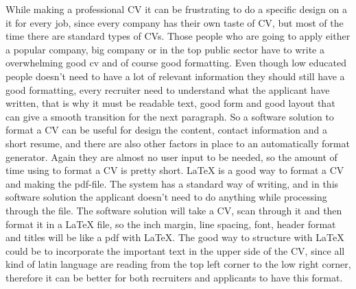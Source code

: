 While making a professional CV it can be frustrating to do a specific design on a it for every job, 
since every company has their own taste of CV, but most of the time there are standard types of CVs. 
Those people who are going to apply either a popular company, big company or
in the top public sector have to write a overwhelming good cv and of course good formatting.
Even though low educated people doesn't need to have a lot of relevant information they should still have a good formatting, 
every recruiter need to understand what the applicant have written, that is why it must be readable text, good form 
and good layout that can give a smooth transition for the next paragraph. 
So a software solution to format a CV can be useful for design the content, contact information and a short resume,
and there are also other factors in place to an automatically format generator. Again they are almost no user input to be needed, 
so the amount of time using to format a CV is pretty short. 
LaTeX is a good way to format a CV and making the pdf-file. The system has a standard way of writing, and in this software solution
the applicant doesn't need to do anything while processing through the file. The software solution will take a CV, scan through it and
then format it in a LaTeX file, so the inch margin, line spacing, font, header format and titles 
will be like a pdf with LaTeX. 
The good way to structure with LaTeX could be to incorporate the important text in the upper side of the CV, 
since all kind of latin language are reading from the top left corner to the low right corner, therefore it can be better
for both recruiters and applicants to have this format.